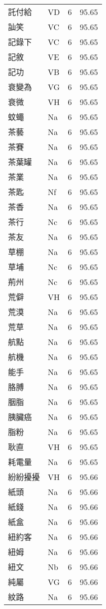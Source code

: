 \documentclass[twocolumn]{book}
\begin{document}
\begin{supertabular}{llrr}
託付給 & VD & 6 &  95.65\\
訕笑 & VC & 6 &  95.65\\
記錄下 & VC & 6 &  95.65\\
記敘 & VE & 6 &  95.65\\
記功 & VB & 6 &  95.65\\
衰變為 & VG & 6 &  95.65\\
衰微 & VH & 6 &  95.65\\
蚊蠅 & Na & 6 &  95.65\\
茶藝 & Na & 6 &  95.65\\
茶賽 & Na & 6 &  95.65\\
茶葉罐 & Na & 6 &  95.65\\
茶業 & Na & 6 &  95.65\\
茶匙 & Nf & 6 &  95.65\\
茶香 & Na & 6 &  95.65\\
茶行 & Nc & 6 &  95.65\\
茶友 & Na & 6 &  95.65\\
草棚 & Na & 6 &  95.65\\
草埔 & Nc & 6 &  95.65\\
荊州 & Nc & 6 &  95.65\\
荒僻 & VH & 6 &  95.65\\
荒漠 & Na & 6 &  95.65\\
荒草 & Na & 6 &  95.65\\
航點 & Na & 6 &  95.65\\
航機 & Na & 6 &  95.65\\
能手 & Na & 6 &  95.65\\
胳膊 & Na & 6 &  95.65\\
胭脂 & Na & 6 &  95.65\\
胰臟癌 & Na & 6 &  95.65\\
脂粉 & Na & 6 &  95.65\\
耿直 & VH & 6 &  95.65\\
耗電量 & Na & 6 &  95.65\\
紛紛擾擾 & VH & 6 &  95.66\\
紙頭 & Na & 6 &  95.66\\
紙錢 & Na & 6 &  95.66\\
紙盒 & Na & 6 &  95.66\\
紐約客 & Na & 6 &  95.66\\
紐姆 & Na & 6 &  95.66\\
紐文 & Nb & 6 &  95.66\\
純屬 & VG & 6 &  95.66\\
紋路 & Na & 6 &  95.66\\

\end{supertabular}
\end{document}
